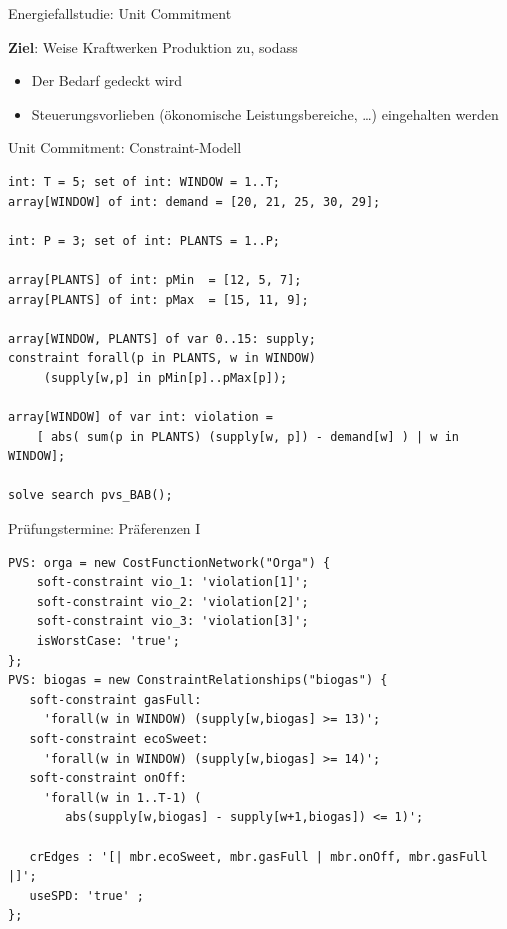 \begin{frame}[fragile]{Energiefallstudie: Unit Commitment}

\textbf{Ziel}: Weise Kraftwerken Produktion zu, sodass
\begin{itemize}
\item Der Bedarf gedeckt wird
\item Steuerungsvorlieben (ökonomische Leistungsbereiche, \ldots) eingehalten werden
\end{itemize}
\fontsize{8pt}{7.2}\selectfont

\end{frame}


\begin{frame}[fragile]{Unit Commitment: Constraint-Modell}
\begin{lstlisting}
int: T = 5; set of int: WINDOW = 1..T;
array[WINDOW] of int: demand = [20, 21, 25, 30, 29];

int: P = 3; set of int: PLANTS = 1..P;

array[PLANTS] of int: pMin  = [12, 5, 7];
array[PLANTS] of int: pMax  = [15, 11, 9];

array[WINDOW, PLANTS] of var 0..15: supply; 
constraint forall(p in PLANTS, w in WINDOW) 
     (supply[w,p] in pMin[p]..pMax[p]);

array[WINDOW] of var int: violation = 
    [ abs( sum(p in PLANTS) (supply[w, p]) - demand[w] ) | w in WINDOW];

solve search pvs_BAB();
\end{lstlisting}
\end{frame}

\begin{frame}[fragile]{Prüfungstermine: Präferenzen I}

\begin{lstlisting}
PVS: orga = new CostFunctionNetwork("Orga") {
    soft-constraint vio_1: 'violation[1]';
    soft-constraint vio_2: 'violation[2]';
    soft-constraint vio_3: 'violation[3]';
    isWorstCase: 'true';
};
PVS: biogas = new ConstraintRelationships("biogas") {
   soft-constraint gasFull: 
     'forall(w in WINDOW) (supply[w,biogas] >= 13)';
   soft-constraint ecoSweet: 
     'forall(w in WINDOW) (supply[w,biogas] >= 14)';
   soft-constraint onOff: 
     'forall(w in 1..T-1) ( 
        abs(supply[w,biogas] - supply[w+1,biogas]) <= 1)';
   
   crEdges : '[| mbr.ecoSweet, mbr.gasFull | mbr.onOff, mbr.gasFull |]';
   useSPD: 'true' ;
}; 
\end{lstlisting}
\end{frame}

